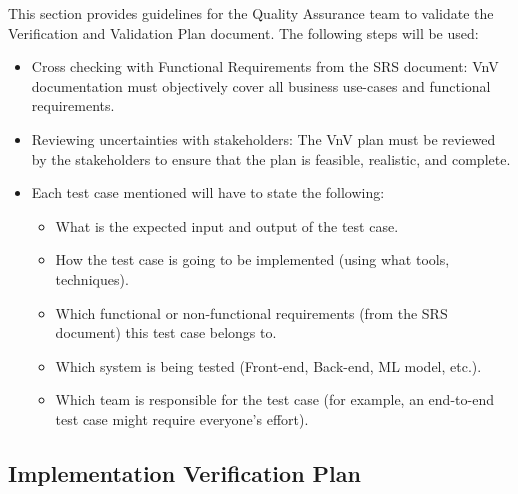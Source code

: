 \documentclass[12pt, titlepage]{article}
\begin{document}
This section provides guidelines for the Quality Assurance team to validate the Verification and Validation Plan document. The following steps will be used:
\begin{itemize}
  \item Cross checking with Functional Requirements from the SRS document: VnV documentation must objectively cover all business use-cases and functional requirements.
  \item Reviewing uncertainties with stakeholders: The VnV plan must be reviewed by the stakeholders to ensure that the plan is feasible, realistic, and complete.
  \item Each test case mentioned will have to state the following:
  \begin{itemize}
    \item What is the expected input and output of the test case.
    \item How the test case is going to be implemented (using what tools, techniques).
    \item Which functional or non-functional requirements (from the SRS document) this test case belongs to.
    \item Which system is being tested (Front-end, Back-end, ML model, etc.).
    \item Which team is responsible for the test case (for example, an end-to-end test case might require everyone's effort).
  \end{itemize}
\end{itemize}

\subsection{Implementation Verification Plan}
\end{document}

